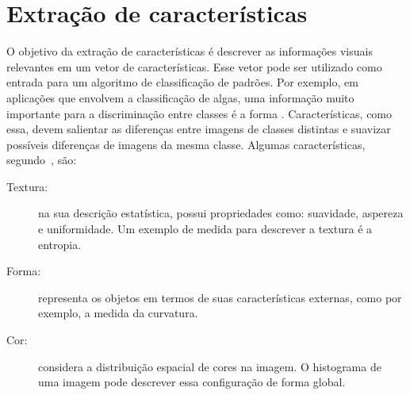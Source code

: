 





\section{Extração de características}
\label{sec:extracao}

O objetivo da extração de características é descrever as informações visuais relevantes em um vetor de características. Esse vetor pode ser utilizado como entrada para um algoritmo de classificação de padrões. Por exemplo, em aplicações que envolvem a classificação de algas, uma informação muito importante para a discriminação entre classes é a forma \cite{Borges2013}. Características, como essa, devem salientar as diferenças entre imagens de classes distintas e suavizar possíveis diferenças de imagens da mesma classe. Algumas características, segundo~, são:

\begin{description}
\item [Textura:] na sua descrição estatística, possui propriedades como: suavidade, aspereza e uniformidade. Um exemplo de medida para descrever a textura é a entropia.
\item [Forma:] representa os objetos em termos de suas características externas, como por exemplo, a medida da curvatura.
\item [Cor:] considera a distribuição espacial de cores na imagem. O histograma de uma imagem pode descrever essa configuração de forma global.
\end{description}


